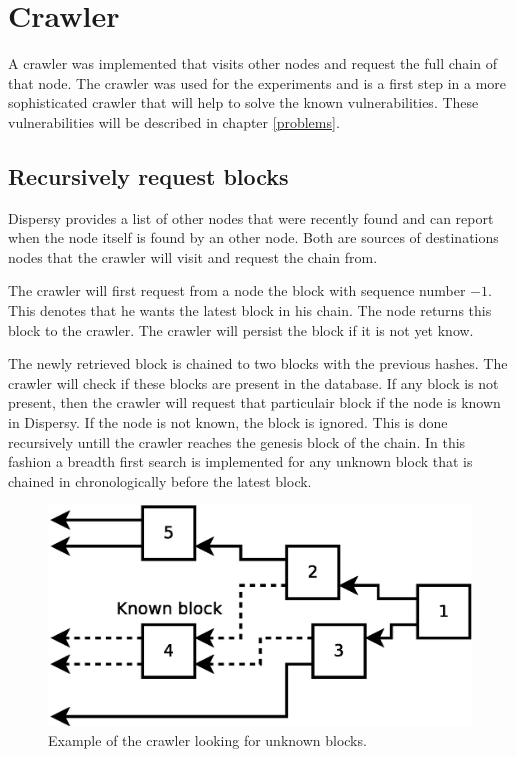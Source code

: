 \section{Crawler}
A crawler was implemented that visits other nodes and request the full chain of that node.
The crawler was used for the experiments and
is a first step in a more sophisticated crawler that will help to solve the known vulnerabilities.
These vulnerabilities will be described in chapter \ref{problems}.

\subsection{Recursively request blocks}
Dispersy provides a list of other nodes that were recently found
and can report when the node itself is found by an other node.
Both are sources of destinations nodes that the crawler will visit
and request the chain from.

The crawler will first request from a node the block with sequence number $-1$.
This denotes that he wants the latest block in his chain.
The node returns this block to the crawler.
The crawler will persist the block if it is not yet know.

The newly retrieved block is chained to two blocks with the previous hashes.
The crawler will check if these blocks are present in the database.
If any block is not present,
then the crawler will request that particulair block if the node is known in Dispersy.
If the node is not known, the block is ignored.
This is done recursively untill the crawler reaches the genesis block of the chain.
In this fashion a breadth first search is implemented for any unknown block
that is chained in chronologically before the latest block.

\begin{figure}
	\centerline{\includegraphics[scale=0.3]{design/figs/crawler.eps}}
	\caption{Example of the crawler looking for unknown blocks.}
	\label{fig:crawler-example}
\end{figure}

